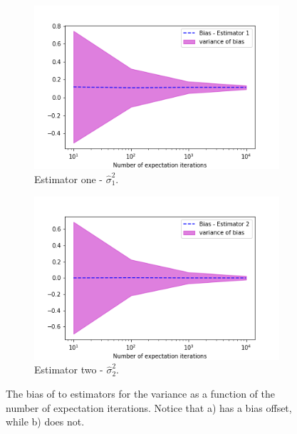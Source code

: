 \documentclass{article}
\begin{document}
 \begin{figure}[!htb]
     \centering
     \begin{subfigure}[b]{0.45\textwidth}
         \centering
         \includegraphics[width=\textwidth]{Q1c_fig2.png}
         \caption{Estimator one - $\hat{\sigma}_1^2$.}
     \end{subfigure}
     \hfill
     \begin{subfigure}[b]{0.45\textwidth}
         \centering
         \includegraphics[width=\textwidth]{Q1c_fig3.png}
         \caption{Estimator two - $\hat{\sigma}_2^2$.}
     \end{subfigure}
        \caption{The bias of to estimators for the variance as a function of the number of expectation iterations. Notice that a) has a bias offset, while b) does not.}
        \label{fig:Q1c_2}
\end{figure}
\end{document}
